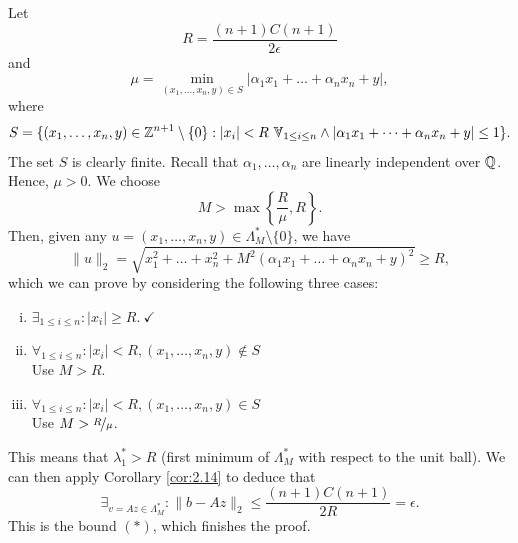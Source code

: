 \documentclass{Vorlesungstemplate_English} %
\begin{document}
\begin{pf}
  Let
  \[ R = \frac{(n+1)C(n+1)}{2\epsilon}\]
  and
  \[ \mu = \min_{(x_1, \dots, x_n,y) \in S} |\alpha_1x_1+\dots+\alpha_nx_n+y|,\]
  where
  \[ S = \{ (x_1, \dots, x_n,y) \in \Z^{n+1} \setminus \{ 0\} : |x_i| < R \forall_{1 \leq i \leq n} \land |\alpha_1x_1+\dots+\alpha_nx_n+y| \leq 1\}.\]
  The set $S$ is clearly finite. Recall that $\alpha_1, \dots, \alpha_n$ are linearly independent over $\mathbb{Q}$. Hence, $\mu > 0$. We choose
  \[ M > \max\left\{ \frac{R}{\mu}, R\right\}.\]
  Then, given any $u = (x_1, \dots, x_n, y) \in \Lambda_M^* \setminus \{ 0\}$, we have
  \[ \|u\|_2 = \sqrt{x_1^2+\dots+x_n^2+M^2(\alpha_1x_1+\dots+\alpha_nx_n+y)^2} \geq R,\]
  which we can prove by considering the following three cases:
  \begin{enumerate}[(i)]
    \item $\exists_{1 \leq i \leq n}: |x_i| \geq R. \ \checkmark$
    \item $\forall_{1 \leq i \leq n}: |x_i| < R, (x_1, \dots, x_n,y) \notin S$ \\
    Use $M > R$.
    \item $\forall_{1 \leq i \leq n}: |x_i| < R, (x_1, \dots, x_n,y) \in S$ \\
    Use $M > \nicefrac{R}{\mu}$.
  \end{enumerate}
  This means that $\lambda_1^* > R$ (first minimum of $\Lambda_M^*$ with respect to the unit ball). We can then apply Corollary \ref{cor:2.14} to deduce that
  \[ \exists_{v = Az \in \Lambda_M^*}: \|b-Az\|_2 \leq \frac{(n+1)C(n+1)}{2R} = \epsilon.\]
  This is the bound $(*)$, which finishes the proof.
\end{pf}
\end{document}
